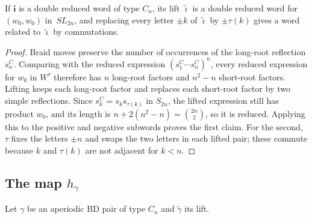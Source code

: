 \documentclass[a4paper]{amsart}
\numberwithin{equation}{section}
\theoremstyle{definition}
\theoremstyle{remark}
\newcommand{\bfi}{\mathbf{i}}
\newcommand{\tbfi}{\widetilde{\boldsymbol{\imath}}}
\newcommand{\tg}{\widetilde{\gamma}}
\newcommand{\SL}{SL_{2n}}
\begin{document}
\begin{lemma}
  \label{lem: lifted word}
  If $\bfi$ is a double reduced word of type $C_n$, its lift $\tbfi$ is a double reduced word for $(w_0,w_0)$ in~$\SL$, and replacing every letter $\pm k$ of $\tbfi$ by $\pm\tau(k)$ gives a word related to $\tbfi$ by commutations.
\end{lemma}
\begin{proof}
  Braid moves preserve the number of occurrences of the long-root reflection $s_n^C$.
  Comparing with the reduced expression $(s_1^C\cdots s_n^C)^n$, every reduced expression for $w_0$ in $W^\tau$ therefore has $n$ long-root factors and $n^2-n$ short-root factors.
  Lifting keeps each long-root factor and replaces each short-root factor by two simple reflections.
  Since $s^C_k=s_ks_{\tau(k)}$ in $S_{2n}$, the lifted expression still has product $w_0$, and its length is $n+2(n^2-n)=\binom{2n}{2}$, so it is reduced.
  Applying this to the positive and negative subwords proves the first claim.
  For the second, $\tau$ fixes the letters $\pm n$ and swaps the two letters in each lifted pair; these commute because $k$ and $\tau(k)$ are not adjacent for $k<n$.
\end{proof}

\subsection{The map \texorpdfstring{$h_\gamma$}{h}}
Let $\gamma$ be an aperiodic BD pair of type $C_n$ and $\tg$ its lift.
\end{document}

